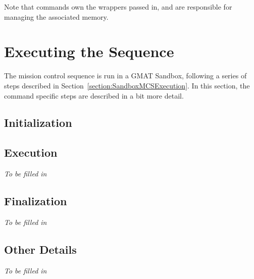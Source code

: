 \noindent Note that commands own the wrappers passed in, and are responsible for managing the
associated memory.

\section{Executing the Sequence}

The mission control sequence is run in a GMAT Sandbox, following a series of steps described in
Section~\ref{section:SandboxMCSExecution}.  In this section, the command specific steps are
described in a bit more detail.

\subsection{Initialization}



\subsection{Execution}

\textit{To be filled in}

\subsection{Finalization}

\textit{To be filled in}

\subsection{Other Details}

\textit{To be filled in}

